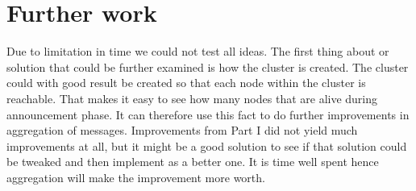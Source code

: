 \documentclass{article}
\begin{document}
  \section{Further work}
    Due to limitation in time we could not test all ideas.
    The first thing about or solution that could be further examined
    is how the cluster is created. The cluster could with good result be created
    so that each node within the cluster is reachable. That makes it easy to see
    how many nodes that are alive during announcement phase. It can therefore 
    use this fact to do further improvements in aggregation of messages.
    Improvements from Part I did not yield much improvements at all, but it might 
    be a good solution to see if that solution could be tweaked and then implement as a better one. 
    It is time well spent hence aggregation will make the improvement more worth.
  
\end{document}
